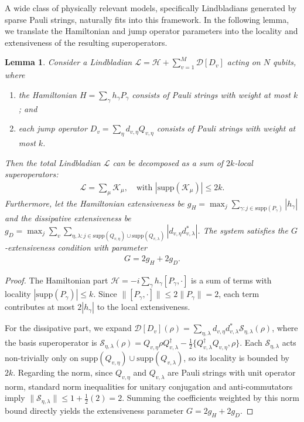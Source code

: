 \documentclass[11pt]{article}
\newtheorem{lemma}{Lemma}
\newcommand{\supp}{\mathrm{supp}}
\begin{document}
A wide class of physically relevant models, specifically Lindbladians generated by sparse Pauli strings, naturally fits into this framework. In the following lemma, we translate the Hamiltonian and jump operator parameters into the locality and extensiveness of the resulting superoperators.

\begin{lemma}
\label{lem:lindblad-mapping}
    Consider a Lindbladian $\mathcal{L} = \mathcal{H} + \sum_{v=1}^M \mathcal{D}[D_v]$ acting on $N$ qubits, where
    \begin{enumerate}
        \item the Hamiltonian $H = \sum_{\gamma} h_\gamma P_\gamma$ consists of Pauli strings with weight at most $k$; and 
        \item each jump operator $D_v = \sum_{\eta} d_{v,\eta} Q_{v,\eta}$ consists of Pauli strings with weight at most $k$.
    \end{enumerate}
    Then the total Lindbladian $\mathcal{L}$ can be decomposed as a sum of \emph{$2k$-local superoperators}:
    \begin{align*}
        \mathcal{L} = \sum_{\mu} \mathcal{K}_\mu, \quad \text{with } |\supp(\mathcal{K}_\mu)| \le 2k.
    \end{align*}
    Furthermore, let the Hamiltonian extensiveness be $g_H = \max_j \sum_{\gamma: j \in \supp(P_\gamma)} |h_\gamma|$ and the dissipative extensiveness be $g_D = \max_j \sum_{v} \sum_{\eta, \lambda: j \in \supp(Q_{v,\eta}) \cup \supp(Q_{v,\lambda})} |d_{v,\eta} d_{v,\lambda}^*|$.
    The system satisfies the \emph{$G$-extensiveness} condition with parameter
    \begin{align*}
        G = 2 g_H + 2 g_D.
    \end{align*}
\end{lemma}
\begin{proof}
    The Hamiltonian part $\mathcal{H} = -i \sum_\gamma h_\gamma [P_\gamma, \cdot]$ is a sum of terms with locality $|\supp(P_\gamma)| \le k$. Since $\|[P_\gamma, \cdot]\| \le 2\|P_\gamma\| = 2$, each term contributes at most $2|h_\gamma|$ to the local extensiveness.
    
    For the dissipative part, we expand $\mathcal{D}[D_v](\rho) = \sum_{\eta,\lambda} d_{v,\eta}d_{v,\lambda}^* \mathcal{S}_{\eta,\lambda}(\rho)$, where the basis superoperator is $\mathcal{S}_{\eta,\lambda}(\rho) = Q_{v,\eta}\rho Q_{v,\lambda}^\dagger - \frac{1}{2}\{Q_{v,\lambda}^\dagger Q_{v,\eta}, \rho\}$. 
    Each $\mathcal{S}_{\eta,\lambda}$ acts non-trivially only on $\supp(Q_{v,\eta}) \cup \supp(Q_{v,\lambda})$, so its locality is bounded by $2k$.
    Regarding the norm, since $Q_{v,\eta}$ and $Q_{v,\lambda}$ are Pauli strings with unit operator norm, standard norm inequalities for unitary conjugation and anti-commutators imply $\|\mathcal{S}_{\eta,\lambda}\|\le 1 + \frac{1}{2}(2) = 2$.
    Summing the coefficients weighted by this norm bound directly yields the extensiveness parameter $G = 2g_H + 2g_D$.
\end{proof}
\end{document}
